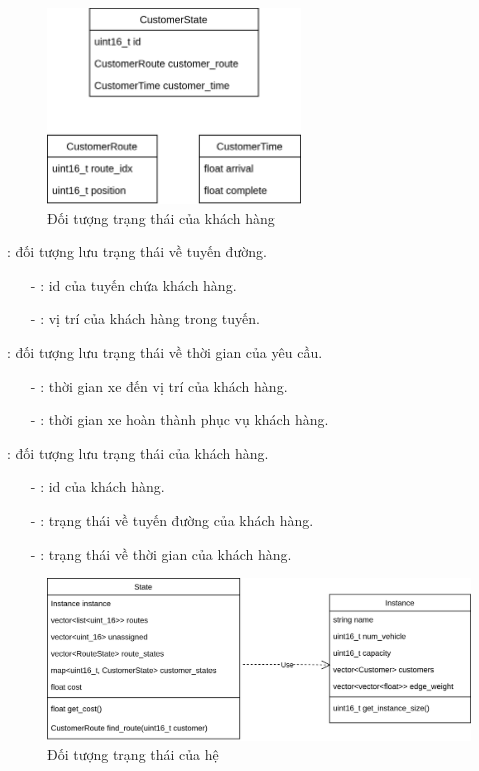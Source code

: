 \begin{figure}[H] %
  \centering %
  \includegraphics[width=0.6\textwidth]{figures/CustomerState.png} 
  \caption{Đối tượng trạng thái của khách hàng} 
  \label{fig:fg_03}
\end{figure}

: đối tượng lưu trạng thái về tuyến đường.
\begin{itemize}
  \item[-] : id của tuyến chứa khách hàng.
  \item[-] : vị trí của khách hàng trong tuyến.
\end{itemize}

: đối tượng lưu trạng thái về thời gian của yêu cầu.
\begin{itemize}
  \item[-] : thời gian xe đến vị trí của khách hàng.
  \item[-] : thời gian xe hoàn thành phục vụ khách hàng.
\end{itemize}

: đối tượng lưu trạng thái của khách hàng.
\begin{itemize}
  \item[-] : id của khách hàng.
  \item[-] : trạng thái về tuyến đường của khách hàng.
  \item[-] : trạng thái về thời gian của khách hàng.
\end{itemize}

\begin{figure}[H] %
  \centering %
  \includegraphics[width=1\textwidth]{figures/core-object.png} 
  \caption{Đối tượng trạng thái của hệ} 
  \label{fig:fg_03}
\end{figure}

